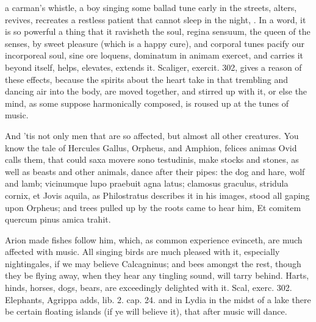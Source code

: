 {a carman's whistle, a boy singing some ballad tune early in the
streets, alters, revives, recreates a restless patient that cannot
sleep in the night, \etc{}. In a word, it is so powerful a thing that it
ravisheth the soul, regina sensuum, the queen of the senses, by sweet
pleasure (which is a happy cure), and corporal tunes pacify our
incorporeal soul, sine ore loquens, dominatum in animam exercet, and
carries it beyond itself, helps, elevates, extends it. Scaliger,
exercit. 302, gives a reason of these effects, because the
spirits about the heart take in that trembling and dancing air into the
body, are moved together, and stirred up with it, or else the mind, as
some suppose harmonically composed, is roused up at the tunes of music.

And 'tis not only men that are so affected, but almost all other
creatures. You know the tale of Hercules Gallus, Orpheus, and Amphion,
felices animas Ovid calls them, that could saxa movere sono testudinis,
\etc{} make stocks and stones, as well as beasts and other animals, dance
after their pipes: the dog and hare, wolf and lamb; vicinumque lupo
praebuit agna latus; clamosus graculus, stridula cornix, et Jovis
aquila, as Philostratus describes it in his images, stood all gaping
upon Orpheus; and trees pulled up by the roots came to hear him,
Et comitem quercum pinus amica trahit.

Arion made fishes follow him, which, as common experience evinceth,
 are much affected with music. All singing birds are much pleased
with it, especially nightingales, if we may believe Calcagninus; and
bees amongst the rest, though they be flying away, when they hear any
tingling sound, will tarry behind. Harts, hinds, horses, dogs,
bears, are exceedingly delighted with it. Scal, exerc. 302. Elephants,
Agrippa adds, lib. 2. cap. 24. and in Lydia in the midst of a lake
there be certain floating islands (if ye will believe it), that after
music will dance.

}
